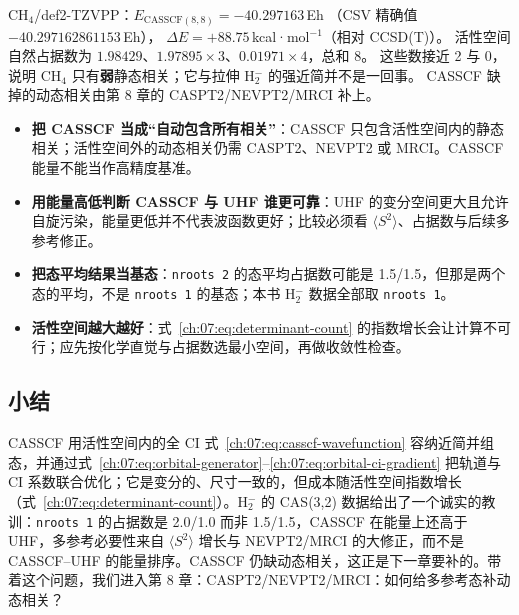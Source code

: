\begin{ch4box}
CH$_4$/def2-TZVPP：$E_{\mathrm{CASSCF}(8,8)} = -40.297163$\,Eh
（CSV 精确值 $-40.297162861153$\,Eh），
$\Delta E = +88.75$\,kcal·mol$^{-1}$（相对 CCSD(T)）。
活性空间自然占据数为 $1.98429$、$1.97895\times3$、$0.01971\times4$，总和 8。
这些数接近 2 与 0，说明 CH$_4$ 只有\textbf{弱}静态相关；它与拉伸 H$_2^-$ 的强近简并不是一回事。
CASSCF 缺掉的动态相关由第 8 章的 CASPT2/NEVPT2/MRCI 补上。
\end{ch4box}

\begin{pitfall}
\begin{itemize}
  \item \textbf{把 CASSCF 当成“自动包含所有相关”}：CASSCF 只包含活性空间内的静态相关；活性空间外的动态相关仍需 CASPT2、NEVPT2 或 MRCI。CASSCF 能量不能当作高精度基准。
  \item \textbf{用能量高低判断 CASSCF 与 UHF 谁更可靠}：UHF 的变分空间更大且允许自旋污染，能量更低并不代表波函数更好；比较必须看 $\langle S^2\rangle$、占据数与后续多参考修正。
  \item \textbf{把态平均结果当基态}：\texttt{nroots 2} 的态平均占据数可能是 1.5/1.5，但那是两个态的平均，不是 \texttt{nroots 1} 的基态；本书 H$_2^-$ 数据全部取 \texttt{nroots 1}。
  \item \textbf{活性空间越大越好}：式~\eqref{ch:07:eq:determinant-count} 的指数增长会让计算不可行；应先按化学直觉与占据数选最小空间，再做收敛性检查。
\end{itemize}
\end{pitfall}

\subsection*{小结}
CASSCF 用活性空间内的全 CI 式~\eqref{ch:07:eq:casscf-wavefunction} 容纳近简并组态，并通过式~\eqref{ch:07:eq:orbital-generator}--\eqref{ch:07:eq:orbital-ci-gradient} 把轨道与 CI 系数联合优化；它是变分的、尺寸一致的，但成本随活性空间指数增长（式~\eqref{ch:07:eq:determinant-count}）。H$_2^-$ 的 CAS(3,2) 数据给出了一个诚实的教训：\texttt{nroots 1} 的占据数是 2.0/1.0 而非 1.5/1.5，CASSCF 在能量上还高于 UHF，多参考必要性来自 $\langle S^2\rangle$ 增长与 NEVPT2/MRCI 的大修正，而不是 CASSCF--UHF 的能量排序。CASSCF 仍缺动态相关，这正是下一章要补的。带着这个问题，我们进入第 8 章：CASPT2/NEVPT2/MRCI：如何给多参考态补动态相关？
